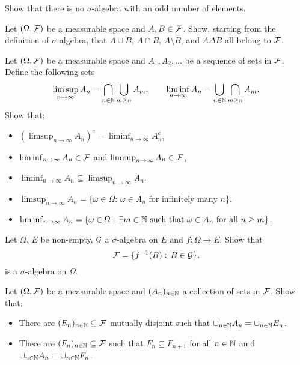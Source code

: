 
\begin{problem}
    Show that there is no $\sigma$-algebra with an odd number of elements.
\end{problem}

\begin{problem}
Let $(\Omega,\mathcal F)$ be a measurable space and $A,B\in \mathcal F$. Show, starting from the definition of $\sigma$-algebra, that $A\cup B$, $A\cap B$, $A\setminus B$, and $A\Delta B$ all belong to $\mathcal F$.
\end{problem}

\begin{problem}
    Let $(\Omega,\mathcal F)$ be a measurable space and $A_1, A_2,\ldots$ be a sequence of sets in $\mathcal F$. Define the following sets
    \begin{equation*}
        \limsup_{n\to\infty} A_n = \bigcap_{n\in \mathbb N} \bigcup_{m\geq n} A_m,\qquad \liminf_{n\to\infty} A_n = \bigcup_{n\in \mathbb N} \bigcap_{m\geq n} A_m.
    \end{equation*}
    Show that:
    \begin{itemize}
        \item $(\limsup_{n\to\infty} A_n)^c = \liminf_{n\to\infty} A_n^c$,
        \item $\liminf_{n\to\infty} A_n \in \mathcal F$ and $\limsup_{n\to\infty} A_n \in \mathcal F$,
        \item $\liminf_{n\to\infty} A_n \subseteq \limsup_{n\to\infty} A_n$.
        \item  $\limsup_{n\to\infty} A_n = \{\omega \in \Omega:\, \omega\in A_n\text{ for infinitely many $n$}\}$.
        \item $\liminf_{n\to\infty} A_n = \{\omega \in \Omega:\, \text{$\exists m\in \mathbb N$ such that $\omega\in A_n$ for all $n\geq m$}\}$.
    \end{itemize}
\end{problem}

\begin{problem}
    Let $\Omega$, $E$ be non-empty, $\mathcal G$ a $\sigma$-algebra on $E$ and $f:\Omega\to E$. Show that 
    \begin{equation*}
        \mathcal F = \{f^{-1}(B):\,B\in \mathcal G\},
    \end{equation*}
    is a $\sigma$-algebra on $\Omega$.
\end{problem}

\begin{problem}
    Let $(\Omega,\mathcal F)$ be a measurable space and $(A_n)_{n\in \mathbb N}$ a collection of sets in $\mathcal F$. Show that:
    \begin{itemize}
        \item There are $(E_n)_{n\in \mathbb N}\subseteq \mathcal F$ mutually disjoint such that $\cup_{n\in \mathbb N} A_n = \cup_{n\in \mathbb N} E_n$.
        \item There are $(F_n)_{n\in \mathbb N}\subseteq \mathcal F$ such that $F_n\subseteq F_{n+1}$ for all $n\in \mathbb N$ amd $\cup_{n\in \mathbb N} A_n = \cup_{n\in \mathbb N} F_n$.
    \end{itemize} 
\end{problem}

